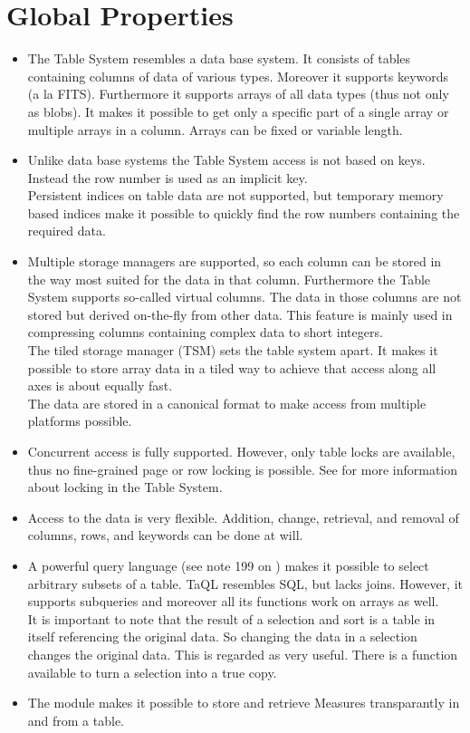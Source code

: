 \section{Global Properties}
\begin{itemize}
\item
The Table System resembles a data base system. It consists of tables
containing columns of data of various types. Moreover it supports
keywords (a la FITS). Furthermore it supports arrays of all data
types (thus not only as blobs). It makes it possible to get only a
specific part of a single array or multiple arrays in a column.
Arrays can be fixed or variable length.
\item
Unlike data base systems the Table System access is not based on keys.
Instead the row number is used as an implicit key.
\\Persistent indices on table data are not supported, but
temporary memory based indices make it possible to quickly find
the row numbers containing the required data.
\item
Multiple storage managers are supported, so each column
can be stored in the way most suited for the data in that column.
Furthermore the Table System supports so-called virtual columns. The
data in those columns are not stored but derived on-the-fly from
other data. This feature is mainly used in compressing columns
containing complex data to short integers.
\\The tiled storage manager (TSM) sets the table system apart.
It makes it possible to store array data in a tiled way to achieve that
access along all axes is about equally fast.
\\The data are stored in a canonical format to make access from
multiple platforms possible.
\item
Concurrent access is fully supported. However, only table locks are
available, thus no fine-grained page or row locking is possible.
See  for more
information about locking in the Table System.
\item
Access to the data is very flexible.
Addition, change, retrieval, and removal of columns, rows, and
keywords can be done at will. 
\item
A powerful query language (see note 199 on
) makes it possible to
select arbitrary subsets of a table. TaQL resembles SQL, but lacks joins.
However, it supports subqueries and moreover all its functions
work on arrays as well.
\\It is important to note that the result of a selection and sort is a table
in itself referencing the original data. So changing the data in a
selection changes the original data. This is regarded as very useful.
There is a function available to turn a selection into a true copy.
\item
The 
module makes it possible to store and retrieve
Measures transparantly in and from a table.
\end{itemize}


